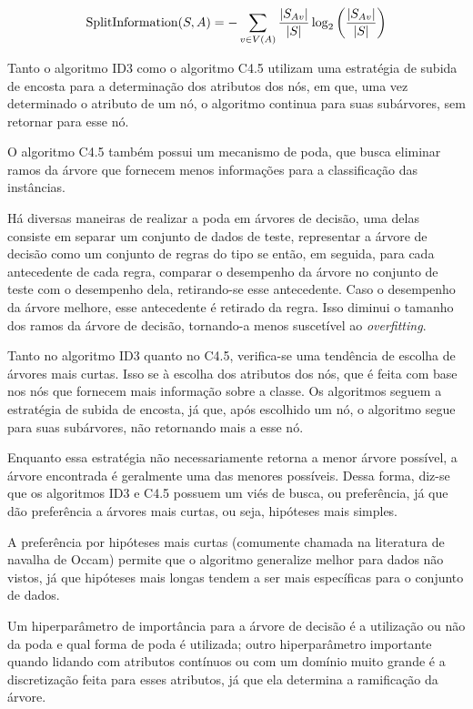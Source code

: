 \documentclass{article}
\begin{document}
\begin{equation}
{\tiny \mathrm{SplitInformation}(S,A) = -\sum_{v\in V(A)} \frac{\left|S_{Av}\right|}{\left|S\right|} \log_2\left(\frac{\left|S_{Av}\right|}{\left|S\right|}\right)}
\end{equation}
\normalsize

Tanto o algoritmo ID3 como o algoritmo C4.5 utilizam uma estratégia de subida de encosta para a determinação dos atributos dos nós,
em que, uma vez determinado o atributo de um nó, o algoritmo continua para suas subárvores, sem retornar para esse nó.

O algoritmo C4.5 também possui um mecanismo de poda, que busca eliminar ramos da árvore que fornecem menos informações para a classificação das instâncias.

Há diversas maneiras de realizar a poda em árvores de decisão,
uma delas consiste em separar um conjunto de dados de teste,
representar a árvore de decisão como um conjunto de regras do tipo se então,
em seguida, para cada antecedente de cada regra, comparar o desempenho da árvore no conjunto de teste com o desempenho dela,
retirando-se esse antecedente. Caso o desempenho da árvore melhore, esse antecedente é retirado da regra.
Isso diminui o tamanho dos ramos da árvore de decisão, tornando-a menos suscetível ao {\it overfitting}.

Tanto no algoritmo ID3 quanto no C4.5,
verifica-se uma tendência de escolha de árvores mais curtas.
Isso se à escolha dos atributos dos nós, que é feita com base nos nós que fornecem mais informação sobre a classe.
Os algoritmos seguem a estratégia de subida de encosta,
já que, após escolhido um nó, o algoritmo segue para suas subárvores, não retornando mais a esse nó.

Enquanto essa estratégia não necessariamente retorna a menor árvore possível, a árvore encontrada é geralmente uma das menores possíveis. Dessa forma, diz-se que os algoritmos ID3 e C4.5 possuem um viés de busca, ou preferência, já que dão preferência a árvores mais curtas, ou seja, hipóteses mais simples. 

A preferência por hipóteses mais curtas (comumente chamada na literatura de navalha de Occam) permite que o algoritmo generalize melhor para dados não vistos,
já que hipóteses mais longas tendem a ser mais específicas para o conjunto de dados.

Um hiperparâmetro de importância para a árvore de decisão é a utilização ou não da poda e qual forma de poda é utilizada;
outro hiperparâmetro importante quando lidando com atributos contínuos ou com um domínio muito grande é a discretização feita para esses atributos,
já que ela determina a ramificação da árvore.
\end{document}
